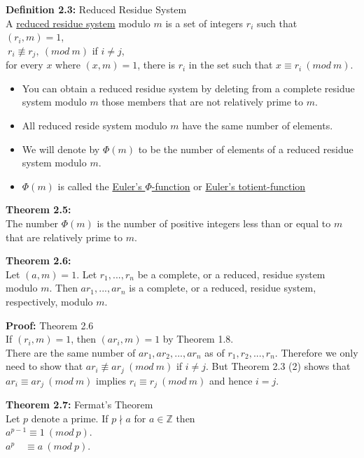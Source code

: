 \documentclass[a4paper]{article}
\begin{document}
\textbf{Definition 2.3:} Reduced Residue System\\
A \underline{reduced residue system} modulo $m$ is a set of integers $r_i$ such that\\
$(r_i,m)=1$,\\
$\ r_i\not\equiv r_j,\ (mod\ m)$ if $i\neq j$,\\
for every $x$ where $(x,m)=1$, there is $r_i$ in the set such that $x \equiv r_i \ (mod\ m)$.

\begin{itemize}
    \item You can obtain a reduced residue system by deleting from a complete residue system modulo $m$ those members that are not relatively prime to $m$.
    \item All reduced reside system modulo $m$ have the same number of elements.
    \item We will denote by $\Phi(m)$ to be the number of elements of a reduced residue system modulo $m$.
    \item $\Phi(m)$ is called the \underline{Euler's $\Phi$-function} or \underline{Euler's totient-function}
\end{itemize}

\textbf{Theorem 2.5:}\\
The number $\Phi(m)$ is the number of positive integers less than or equal to $m$ that are relatively prime to $m$.

\textbf{Theorem 2.6:}\\
Let $(a,m)=1$. Let $r_1,...,r_n$ be a complete, or a reduced, residue system modulo $m$. Then $ar_1,...,ar_n$ is a complete, or a reduced, residue system, respectively, modulo $m$.

\textbf{Proof:} Theorem 2.6\\
If $(r_i,m)=1$, then $(ar_i,m)=1$ by Theorem 1.8.\\
There are the same number of $ar_1,ar_2,...,ar_n$ as of $r_1,r_2,...,r_n$. Therefore we only need to show that $ar_i \not \equiv  ar_j \ (mod\ m)$ if $i\neq j$. But Theorem 2.3 (2) shows that $ar_i \equiv ar_j \ (mod\ m)$ implies $r_i \equiv r_j \ (mod\ m)$ and hence $i=j$.


\textbf{Theorem 2.7:} Fermat's Theorem\\
Let $p$ denote a prime. If $p\nmid a$ for $a\in\mathbb{Z}$ then\\
$a^{p-1}\equiv 1\ (mod\ p)$.\\
$a^{p}\quad\equiv a\ (mod\ p)$.
\end{document}
